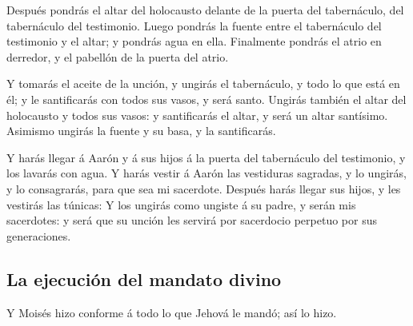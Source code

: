  Después pondrás el altar del holocausto delante de la
puerta del tabernáculo, del tabernáculo del testimonio. 
Luego pondrás la fuente entre el tabernáculo del testimonio y el altar;
y pondrás agua en ella.  Finalmente pondrás el atrio en
derredor, y el pabellón de la puerta del atrio.

 Y tomarás el aceite de la unción, y ungirás el
tabernáculo, y todo lo que está en él; y le santificarás con todos sus
vasos, y será santo.  Ungirás también el altar del
holocausto y todos sus vasos: y santificarás el altar, y será un altar
santísimo.  Asimismo ungirás la fuente y su basa, y la
santificarás.

 Y harás llegar á Aarón y á sus hijos á la puerta del
tabernáculo del testimonio, y los lavarás con agua.  Y
harás vestir á Aarón las vestiduras sagradas, y lo ungirás, y lo
consagrarás, para que sea mi sacerdote.  Después harás
llegar sus hijos, y les vestirás las túnicas:  Y los
ungirás como ungiste á su padre, y serán mis sacerdotes: y será que su
unción les servirá por sacerdocio perpetuo por sus generaciones.

\hypertarget{la-ejecuciuxf3n-del-mandato-divino}{%
\subsection{La ejecución del mandato
divino}\label{la-ejecuciuxf3n-del-mandato-divino}}

 Y Moisés hizo conforme á todo lo que Jehová le mandó;
así lo hizo.

